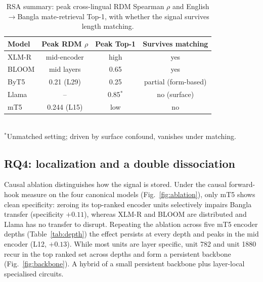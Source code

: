 \documentclass[preprint,12pt]{elsarticle}
\begin{document}
\begin{table}[H]
\caption{RSA summary: peak cross-lingual RDM Spearman $\rho$ and English$\to$Bangla mate-retrieval Top-1, with whether the signal survives length matching.}
\label{tab:rsa}
\centering
\small
\setlength{\tabcolsep}{5pt}
\begin{tabular}{lccc}
\toprule
\textbf{Model} & \textbf{Peak RDM $\rho$} & \textbf{Peak Top-1} & \textbf{Survives matching} \\
\midrule
XLM-R & mid-encoder & high & yes \\
BLOOM & mid layers  & 0.65 & yes \\
ByT5  & 0.21 (L29)  & 0.25 & partial (form-based) \\
Llama & --          & 0.85$^\ast$ & no (surface) \\
mT5   & 0.244 (L15) & low  & no \\
\bottomrule
\end{tabular}
\\[2pt]
{\footnotesize $^\ast$Unmatched setting; driven by surface confound, vanishes under matching.}
\end{table}

\subsection{RQ4: localization and a double dissociation}
Causal ablation distinguishes how the signal is stored. Under the causal forward-hook measure on the four canonical models (Fig.~\ref{fig:ablation}), only mT5 shows clean specificity: zeroing its top-ranked encoder units selectively impairs Bangla transfer (specificity $+0.11$), whereas XLM-R and BLOOM are distributed and Llama has no transfer to disrupt. Repeating the ablation across five mT5 encoder depths (Table~\ref{tab:depth}) the effect persists at every depth and peaks in the mid encoder (L12, $+0.13$). While most units are layer specific, unit 782 and unit 1880 recur in the top ranked set across depths and form a persistent backbone (Fig.~\ref{fig:backbone}). A hybrid of a small persistent backbone plus layer-local specialised circuits.
\end{document}
